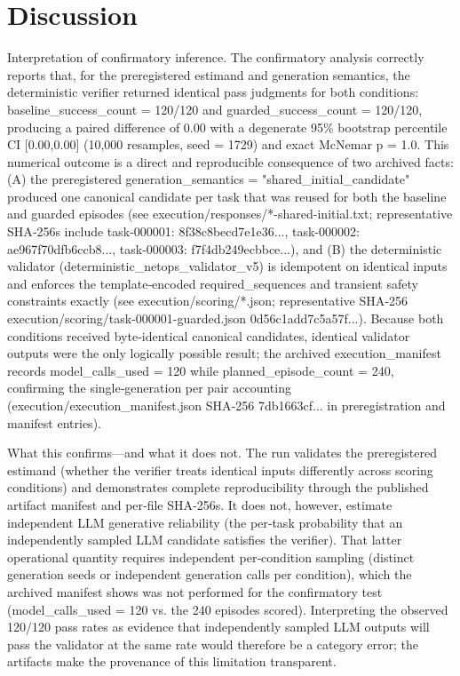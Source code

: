 \documentclass[conference]{IEEEtran}
\begin{document}
\section{Discussion}
Interpretation of confirmatory inference. The confirmatory analysis correctly reports that, for the preregistered estimand and generation semantics, the deterministic verifier returned identical pass judgments for both conditions: baseline\_success\_count = 120/120 and guarded\_success\_count = 120/120, producing a paired difference of 0.00 with a degenerate 95\% bootstrap percentile CI [0.00,0.00] (10,000 resamples, seed = 1729) and exact McNemar p = 1.0. This numerical outcome is a direct and reproducible consequence of two archived facts: (A) the preregistered generation\_semantics = "shared\_initial\_candidate" produced one canonical candidate per task that was reused for both the baseline and guarded episodes (see execution/responses/*-shared-initial.txt; representative SHA‑256s include task-000001: 8f38c8becd7e1e36..., task-000002: ae967f70dfb6ccb8..., task-000003: f7f4db249ecbbce...), and (B) the deterministic validator (deterministic\_netops\_validator\_v5) is idempotent on identical inputs and enforces the template‑encoded required\_sequences and transient safety constraints exactly (see execution/scoring/*.json; representative SHA‑256 execution/scoring/task-000001-guarded.json 0d56c1add7c5a57f...). Because both conditions received byte‑identical canonical candidates, identical validator outputs were the only logically possible result; the archived execution\_manifest records model\_calls\_used = 120 while planned\_episode\_count = 240, confirming the single‑generation per pair accounting (execution/execution\_manifest.json SHA‑256 7db1663cf... in preregistration and manifest entries).

What this confirms---and what it does not. The run validates the preregistered estimand (whether the verifier treats identical inputs differently across scoring conditions) and demonstrates complete reproducibility through the published artifact manifest and per‑file SHA‑256s. It does not, however, estimate independent LLM generative reliability (the per‑task probability that an independently sampled LLM candidate satisfies the verifier). That latter operational quantity requires independent per‑condition sampling (distinct generation seeds or independent generation calls per condition), which the archived manifest shows was not performed for the confirmatory test (model\_calls\_used = 120 vs. the 240 episodes scored). Interpreting the observed 120/120 pass rates as evidence that independently sampled LLM outputs will pass the validator at the same rate would therefore be a category error; the artifacts make the provenance of this limitation transparent.
\end{document}
